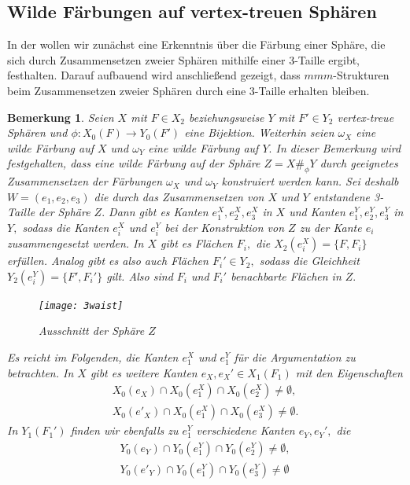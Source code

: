 \documentclass[12pt,titlepage,twoside,cleardoublepage]{article}
\theoremstyle{nummermitklammern}
\newtheorem{bemerkung}[temp]{Bemerkung}
\newtheorem{bemerkung}[zahl]{Bemerkung}
\numberwithin{equation}{section}
\begin{document}
\subsection{Wilde Färbungen auf vertex-treuen Sphären}
In der  wollen wir zunächst eine Erkenntnis über die Färbung einer Sphäre, die sich durch Zusammensetzen zweier Sphären mithilfe einer 3-Taille ergibt, festhalten. Darauf aufbauend wird anschließend gezeigt, dass $mmm$-Strukturen beim Zusammensetzen zweier Sphären durch eine 3-Taille erhalten bleiben.
\begin{bemerkung}\label{bemf}
Seien $X$ mit $F\in X_2$ beziehungsweise $Y$ mit $F'\in Y_2$ vertex-treue Sphären und $\phi:X_0(F)\to Y_0(F')$ eine Bijektion. Weiterhin seien $\omega_X$ eine wilde Färbung auf $X$ und $\omega_Y$ eine wilde Färbung auf $Y.$
In dieser Bemerkung wird festgehalten, dass eine wilde Färbung auf der Sphäre $Z=X\#_{\phi}Y$ durch geeignetes Zusammensetzen der Färbungen $\omega_X$ und $\omega_Y$ konstruiert werden kann. Sei deshalb $W=(e_1,e_2,e_3)$ die durch das Zusammensetzen von $X$ und $Y$ entstandene 3-Taille der Sphäre $Z.$
 Dann gibt es Kanten $e_1^X,e_2^X,e_3^X$ in $X$ und Kanten $e_1^Y,e_2^Y,e_3^Y$ in $Y,$ sodass die Kanten $e_i^X$ und $e_i^Y$ bei der Konstruktion von $Z$ zu der Kante $e_i$ zusammengesetzt werden.
  In $X$ gibt es 
   Flächen $F_i,$ die $X_2(e_i^X)=\{F,F_i\}$ erfüllen.
   Analog gibt es also auch Flächen $F_i' \in Y_2,$ sodass die Gleichheit $Y_2(e_i^Y)=\{F',F_i'\}$ gilt. Also sind $F_i$ und $F_i'$ benachbarte Flächen in $Z.$
\begin{figure}[H]
\begin{center}
\texttt{[image: 3waist]}
\end{center}
\caption{Ausschnitt der Sphäre $Z$}
\end{figure}   
    Es reicht im Folgenden, die Kanten $e_1^X$ und $e_1^Y$ für die Argumentation zu betrachten. In $X$ gibt es weitere Kanten $e_X,e_X'\in X_1(F_1)$ mit den Eigenschaften
\begin{align*}
X_0(e_X)\cap X_0(e_1^X)\cap X_0(e_2^X)\neq \emptyset, \\
  X_0(e'_X)\cap X_0(e_1^X)\cap X_0(e_3^X)\neq \emptyset .  
\end{align*}
In $Y_1(F_1')$ finden wir ebenfalls zu $e_1^Y$ verschiedene Kanten $e_Y,e_Y',$ die  
\begin{align*}
   Y_0(e_Y)\cap Y_0(e_1^Y)\cap Y_0(e_2^Y)\neq \emptyset ,\\
  Y_0(e'_Y)\cap Y_0(e_1^Y)\cap Y_0(e_3^Y)\neq \emptyset   
\end{align*}

\end{bemerkung}
\end{document}

